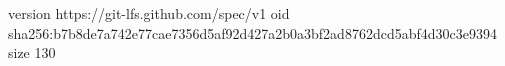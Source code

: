 version https://git-lfs.github.com/spec/v1
oid sha256:b7b8de7a742e77cae7356d5af92d427a2b0a3bf2ad8762dcd5abf4d30c3e9394
size 130
